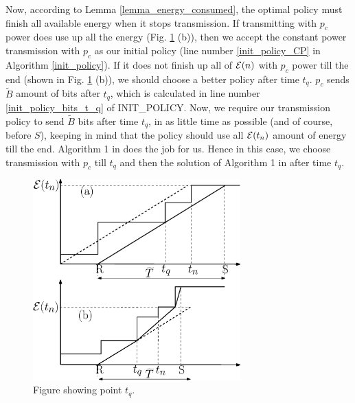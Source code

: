 Now, according to Lemma \ref{lemma_energy_consumed}, the optimal policy must finish all available energy when it stops transmission. If transmitting with $p_c$ power does use up all the energy (Fig. \ref{straight} (b)), then we accept the constant power transmission with $p_c$ as our initial policy (line number \ref{init_policy_CP} in Algorithm \ref{init_policy}). If it does not finish up all of $\mathcal{E}(n)$ with $p_c$ power till the end (shown in Fig. \ref{straight} (b)), we should choose a better policy after time $t_q$. $p_c$ sends $\widetilde{B}$ amount of bits after $t_q$, which is calculated in line number \ref{init_policy_bits_t_q} of INIT\_POLICY. Now, we require our transmission policy to send $\widetilde{B}$ bits after time $t_q$, in as little time as possible (and of course, before $S$), keeping in mind that the policy should use all $\mathcal{E}(t_n)$ amount of energy till the end. Algorithm 1 in \cite{Yang} does the job for us. Hence in this case, we choose transmission with $p_c$ till $t_q$ and then the solution of Algorithm 1 in \cite{Yang} after time $t_q$. 

\begin{figure}
\label{straight}
\centering
  \centerline{\includegraphics[width=8cm]{straight.eps}}
\caption{Figure showing point $t_q$.}
\end{figure}

